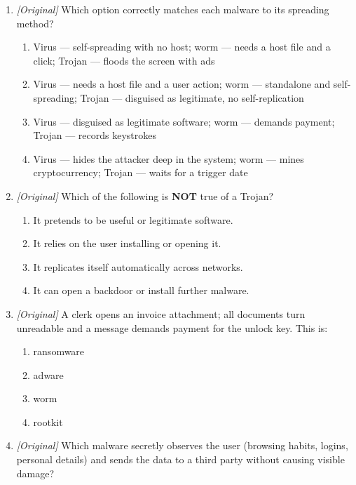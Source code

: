 \documentclass[11pt]{article}
\begin{document}
\begin{enumerate}[label=\textbf{Q\arabic*.}, leftmargin=*]
\begin{enumerate}[label=\Alph*.]
    \item logic bomb
  \end{enumerate}
\item \textit{[Original]} Which option correctly matches each malware to its
  spreading method?
  \begin{enumerate}[label=\Alph*.]
    \item Virus --- self-spreading with no host; worm --- needs a host file
      and a click; Trojan --- floods the screen with ads
    \item Virus --- needs a host file and a user action; worm --- standalone
      and self-spreading; Trojan --- disguised as legitimate, no
      self-replication
    \item Virus --- disguised as legitimate software; worm --- demands
      payment; Trojan --- records keystrokes
    \item Virus --- hides the attacker deep in the system; worm --- mines
      cryptocurrency; Trojan --- waits for a trigger date
  \end{enumerate}
\item \textit{[Original]} Which of the following is \textbf{NOT} true of a
  Trojan?
  \begin{enumerate}[label=\Alph*.]
    \item It pretends to be useful or legitimate software.
    \item It relies on the user installing or opening it.
    \item It replicates itself automatically across networks.
    \item It can open a backdoor or install further malware.
  \end{enumerate}
\item \textit{[Original]} A clerk opens an invoice attachment; all documents
  turn unreadable and a message demands payment for the unlock key. This is:
  \begin{enumerate}[label=\Alph*.]
    \item ransomware
    \item adware
    \item worm
    \item rootkit
  \end{enumerate}
\item \textit{[Original]} Which malware secretly observes the user (browsing
  habits, logins, personal details) and sends the data to a third party
  without causing visible damage?
  \begin{enumerate}[label=\Alph*.]

\end{enumerate}
\end{enumerate}
\end{document}

